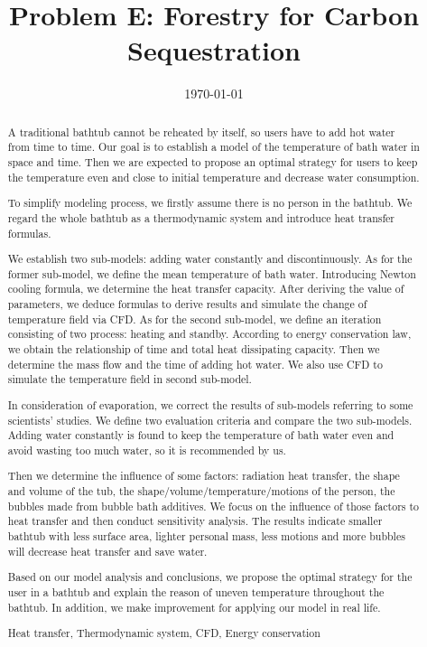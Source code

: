 \documentclass{mcmthesis}
\title{Problem E: Forestry for Carbon Sequestration}
\date{\today}
\begin{document}
\begin{abstract}

A traditional bathtub cannot be reheated by itself, so users have to add hot water from time to time. Our goal is to establish a model of the temperature of bath water in space and time. Then we are expected to propose an optimal strategy for users to keep the temperature even and close to initial temperature and decrease water consumption.

To simplify modeling process, we firstly assume there is no person in the bathtub. We regard the whole bathtub as a thermodynamic system and introduce heat transfer formulas.

We establish two sub-models: adding water constantly and discontinuously. As for the former sub-model, we define the mean temperature of bath water. Introducing Newton cooling formula, we determine the heat transfer capacity. After deriving the value of parameters, we deduce formulas to derive results and simulate the change of temperature field via CFD. As for the second sub-model, we define an iteration consisting of two process: heating and standby. According to energy conservation law, we obtain the relationship of time and total heat dissipating capacity. Then we determine the mass flow and the time of adding hot water. We also use CFD to simulate the temperature field in second sub-model.

In consideration of evaporation, we correct the results of sub-models referring to some scientists' studies. We define two evaluation criteria and compare the two sub-models. Adding water constantly is found to keep the temperature of bath water even and avoid wasting too much water, so it is recommended by us.

Then we determine the influence of some factors: radiation heat transfer, the shape and volume of the tub, the shape/volume/temperature/motions of the person, the bubbles made from bubble bath additives. We focus on the influence of those factors to heat transfer and then conduct sensitivity analysis. The results indicate smaller bathtub with less surface area, lighter personal mass, less motions and more bubbles will decrease heat transfer and save water.

Based on our model analysis and conclusions, we propose the optimal strategy for the user in a bathtub and explain the reason of uneven temperature throughout the bathtub. In addition, we make improvement for applying our model in real life.

\begin{keywords}
Heat transfer, Thermodynamic system, CFD, Energy conservation
\end{keywords}

\end{abstract}
\end{document}
